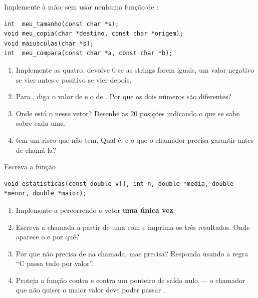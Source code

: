 \documentclass[11pt,a4paper]{article}
\begin{document}
Implemente à mão, sem usar nenhuma função de :

\begin{lstlisting}
int  meu_tamanho(const char *s);
void meu_copia(char *destino, const char *origem);
void maiusculas(char *s);
int  meu_compara(const char *a, const char *b);
\end{lstlisting}

\begin{enumerate}[label=(\alph*),leftmargin=1.8em,itemsep=1pt]
  \item Implemente as quatro.  devolve $0$ se as strings forem iguais,
        um valor negativo se  vier antes e positivo se vier depois.
  \item Para , diga o valor de  e o de
        . Por que os dois números são diferentes?
  \item Onde está o  nesse vetor? Desenhe as 20 posições
        indicando o que se sabe sobre cada uma.
  \item {} tem um risco que  não tem. Qual é, e o que o
        chamador precisa garantir antes de chamá-la?
\end{enumerate}

Escreva a função

\begin{lstlisting}
void estatisticas(const double v[], int n, double *media, double *menor, double *maior);
\end{lstlisting}

\begin{enumerate}[label=(\alph*),leftmargin=1.8em,itemsep=1pt]
  \item Implemente-a percorrendo o vetor \textbf{uma única vez}.
  \item Escreva a chamada a partir de uma  com
         e imprima os três resultados.
        Onde aparece o \cd{\&} e por quê?
  \item Por que  não precisa de \cd{\&} na chamada, mas  precisa?
        Responda usando a regra ``C passa tudo por valor''.
  \item Proteja a função contra  e contra um ponteiro de saída nulo ---
        o chamador que não quiser o maior valor deve poder passar .
\end{enumerate}
\end{document}
